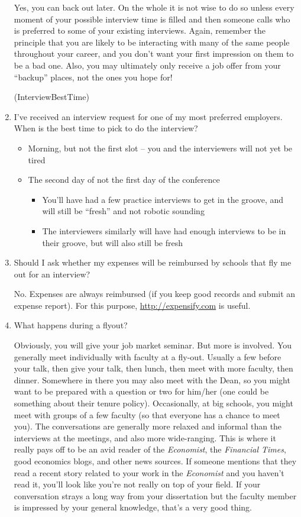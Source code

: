 \documentclass{econtex}
\providecommand\phantomsection{}
\begin{document}
\begin{enumerate}
  Yes, you can back out later.  On the whole it is not wise to do so unless every moment of your possible interview time is filled and then someone calls who is preferred to some of your existing interviews.  Again, remember the principle that you are likely to be interacting with many of the same people throughout your career, and you don't want your first impression on them to be a bad one.  Also, you may ultimately only receive a job offer from your ``backup'' places, not the ones you hope for!

  \ifdvi\phantomsection\hypertarget{InterviewBestTime}{(InterviewBestTime)}\fi
  
\item I've received an interview request for one of my most preferred employers. When is the best time to pick to do the interview?
  \begin{itemize}
  \item Morning, but not the first slot -- you and the interviewers will not yet be tired
  \item The second day of not the first day of the conference
    \begin{itemize}
    \item You'll have had a few practice interviews to get in the groove, and will still be ``fresh'' and not robotic sounding
    \item The interviewers similarly will have had enough interviews to be in their groove, but will also still be fresh
    \end{itemize}
  \end{itemize}

\item Should I ask whether my expenses will be reimbursed by schools that fly me out for an interview?

No.  Expenses are always reimbursed (if you keep good records and submit an expense report).  For this purpose, \url{http://expensify.com} is useful.

\item What happens during a flyout?

  Obviously, you will give your job market seminar.  But more is
  involved.  You generally meet individually with faculty at a
  fly-out.  Usually a few before your talk, then give your talk, then
  lunch, then meet with more faculty, then dinner.  Somewhere in there
  you may also meet with the Dean, so you might want to be prepared
  with a question or two for him/her (one could be something about
  their tenure policy).  Occasionally, at big schools, you might meet
  with groups of a few faculty (so that everyone has a chance to meet
  you).  The conversations are generally more relaxed and informal
  than the interviews at the meetings, and also more wide-ranging.
  This is where it really pays off to be an avid reader of the {\it Economist},
the {\it Financial Times}, good economics blogs, and other news sources.
If someone mentions that they read a recent story related to your 
work in the {\it Economist} and you haven't read it, you'll look like
you're not really on top of your field.  If your conversation strays
a long way from your dissertation but the faculty member is impressed 
by your general knowledge, that's a very good thing.


\end{enumerate}
\end{document}
